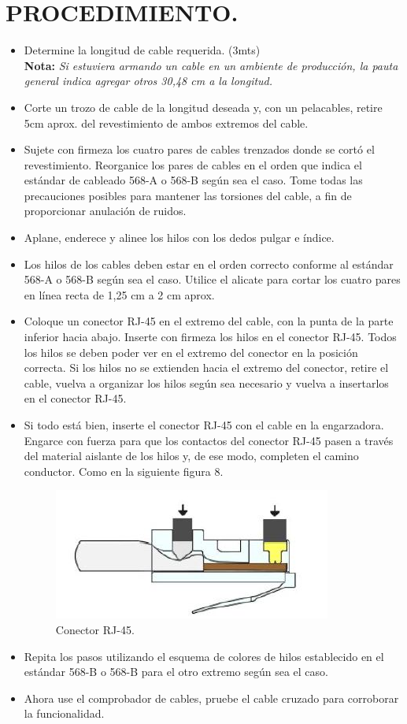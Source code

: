 \documentclass[journal]{IEEEtran}
\begin{document}
\section{PROCEDIMIENTO.}
\begin{itemize}
\item Determine la longitud de cable requerida. (3mts)\\
\textbf{Nota:}
\textit{Si estuviera armando un cable en un ambiente de producción, la pauta general indica agregar otros 30,48 cm a la longitud.}
\item Corte un trozo de cable de la longitud deseada y, con un pelacables, retire 5cm aprox. del revestimiento de ambos extremos del cable.
\item Sujete con firmeza los cuatro pares de cables trenzados donde se cortó el revestimiento. Reorganice los pares de cables en el orden que indica el estándar de cableado 568-A o 568-B según sea el caso. Tome todas las precauciones posibles para mantener las torsiones del cable, a fin de proporcionar anulación de ruidos.
\item Aplane, enderece y alinee los hilos con los dedos pulgar e índice.
\item Los hilos de los cables deben estar en el orden correcto conforme al estándar 568-A o 568-B según sea el caso. Utilice el alicate para cortar los cuatro pares en línea recta de 1,25 cm a 2 cm aprox.
\item Coloque un conector RJ-45 en el extremo del cable, con la punta de la parte inferior hacia abajo. Inserte con firmeza los hilos en el conector RJ-45. Todos los hilos se deben poder ver en el extremo del conector en la posición correcta. Si los hilos no se extienden hacia el extremo del conector, retire el cable, vuelva a organizar los hilos según sea necesario y vuelva a insertarlos en el conector RJ-45.
\item Si todo está bien, inserte el conector RJ-45 con el cable en la engarzadora. Engarce con fuerza para que los contactos del conector RJ-45 pasen a través del material aislante de los hilos y, de ese modo, completen el camino conductor. Como en la siguiente figura 8.
\begin{center}
\begin{figure}[H]
\centering
\includegraphics[scale=0.75]{8.JPG} 
\caption{Conector RJ-45.}
\end{figure}
\end{center}
\item Repita los pasos utilizando el esquema de colores de hilos establecido en el estándar 568-B o 568-B para el otro extremo según sea el caso.
\item Ahora use el comprobador de cables, pruebe el cable cruzado para corroborar la funcionalidad.

\end{itemize}
\end{document}
